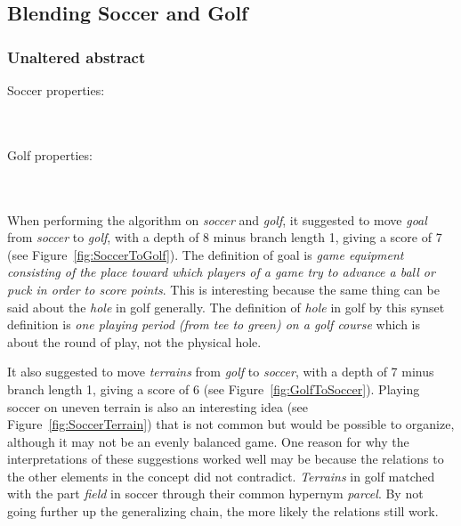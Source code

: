 \subsection{Blending Soccer and Golf }

\subsubsection{Unaltered abstract}

Soccer properties:

\noindent{}
\\\\Golf properties:
	
\noindent{}
\\\\When performing the algorithm on \emph{soccer} and \emph{golf}, it suggested to move \emph{goal} from \emph{soccer} to \emph{golf}, with a depth of 8 minus branch length 1, giving a score of 7 (see Figure~\ref{fig:SoccerToGolf}). The definition of goal is \emph{game equipment consisting of the place toward which players of a game try to advance a ball or puck in order to score points}. This is interesting because the same thing can be said about the \emph{hole} in golf generally. The definition of \emph{hole} in golf by this synset definition is \emph{one playing period (from tee to green) on a golf course} which is about the round of play, not the physical hole.


It also suggested to move \emph{terrains} from \emph{golf} to \emph{soccer}, with a depth of 7 minus branch length 1, giving a score of 6 (see Figure~\ref{fig:GolfToSoccer}).
Playing soccer on uneven terrain is also an interesting idea (see Figure~\ref{fig:SoccerTerrain}) that is not common but would be possible to organize, although it may not be an evenly balanced game. One reason for why the interpretations of these suggestions worked well may be because the relations to the other elements in the concept did not contradict. \emph{Terrains} in golf matched with the part \emph{field} in soccer through their common hypernym \emph{parcel}. By not going further up the generalizing chain, the more likely the relations still work.

